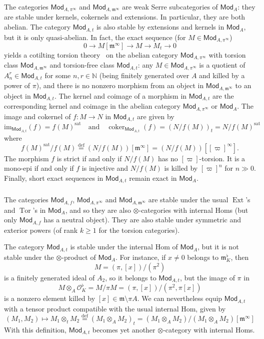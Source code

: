 \documentclass[11pt]{article}
\theoremstyle{definition}
\numberwithin{equation}{section}
\numberwithin{figure}{section}
\numberwithin{table}{section}
\newcommand{\Mod}{\mathsf{Mod}}
\DeclareMathOperator{\Ext}{Ext}
\DeclareMathOperator{\coker}{coker}
\DeclareMathOperator{\Tor}{Tor}
\newcommand{\eqd}{\stackrel{\mathrm{def}}{=}}
\begin{document}
The categories $\Mod_{A,\pi^{\infty}}$ and $\Mod_{A,\mathfrak{m}^{\infty}}$ are weak Serre subcategories of $\Mod_{A}$: they are stable under kernels, cokernels and extensions. In particular, they are both abelian. The category $\Mod_{A,t}$ is also stable by extensions and kernels in $\Mod_{A}$, but it is only quasi-abelian. In fact, the exact sequence (for $M\in\Mod_{A,\pi^{\infty}}$)
\[
0\rightarrow M[\mathfrak{m}^{\infty}]\rightarrow M\rightarrow M_{t}\rightarrow0
\]
yields a cotilting torsion theory~\cite{BoVdB03} on the abelian category $\Mod_{A,\pi^{\infty}}$ with torsion class $\Mod_{A,\mathfrak{m}^{\infty}}$ and torsion-free class $\Mod_{A,t}$: any $M\in\Mod_{A,\pi^{\infty}}$ is a quotient of $A_{n}^{r}\in\Mod_{A,t}$ for some $n,r\in\mathbb{N}$ (being finitely generated over $A$ and killed by a power of $\pi$), and there is no nonzero morphism from an object in $\Mod_{A,\mathfrak{m}^{\infty}}$ to an object in $\Mod_{A,t}$. The kernel and coimage of a morphism in $\Mod_{A,t}$ are the corresponding kernel and coimage in the abelian category $\Mod_{A,\pi^{\infty}}$ or $\Mod_{A}$. The image and cokernel of $f:M\rightarrow N$ in $\Mod_{A,t}$ are given by
\[
\mathrm{im}_{\Mod_{A,t}}(f)=f(M)^{\mathrm{sat}}\quad\text{and}\quad\coker_{\Mod_{A,t}}(f)=(N/f(M))_{t}=N/f(M)^{\mathrm{sat}}
\]
where
\[
f(M)^{\mathrm{sat}}/f(M)\eqd(N/f(M))[\mathfrak{m}^{\infty}]=(N/f(M))[[\varpi]^{\infty}].
\]
The morphism $f$ is strict if and only if $N/f(M)$ has no $[\varpi]$-torsion. It is a mono-epi if and only if $f$ is injective and $N/f(M)$ is killed by $[\varpi]^{n}$ for $n\gg0$. Finally, short exact sequences in $\Mod_{A,t}$ remain exact in $\Mod_{A}$.

\subsubsection{}

The categories $\Mod_{A,f}$, $\Mod_{A,\pi^{\infty}}$ and $\Mod_{A,\mathfrak{m}^{\infty}}$ are stable under the usual $\Ext$'s and $\Tor$'s in $\Mod_{A}$, and so they are also $\otimes$-categories with internal Homs (but only $\Mod_{A,f}$ has a neutral object). They are also stable under symmetric and exterior powers (of rank $k\geq1$ for the torsion categories).

The category $\Mod_{A,t}$ is stable under the internal Hom of $\Mod_{A}$, but it is not stable under the $\otimes$-product of $\Mod_{A}$. For instance, if $x\neq0$ belongs to $\mathfrak{m}_{K}^{\flat}$, then
\[
M=(\pi,[x])/(\pi^{2})
\]
is a finitely generated ideal of $A_{2}$, so it belongs to $\Mod_{A,t}$, but the image of $\pi$ in
\[
M\otimes_{A}\mathcal{O}_{K}^{\flat}=M/\pi M=(\pi,[x])/(\pi^{2},\pi[x])
\]
is a nonzero element killed by $[x]\in\mathfrak{m}\setminus\pi A$. We can nevertheless equip $\Mod_{A,t}$ with a tensor product compatible with the usual internal Hom, given by
\[
(M_{1},M_{2})\mapsto M_{1}\otimes_{t}M_{2}\eqd\left(M_{1}\otimes_{A}M_{2}\right)_{t}=\left(M_{1}\otimes_{A}M_{2}\right)/\left(M_{1}\otimes_{A}M_{2}\right)[\mathfrak{m}^{\infty}]
\]
With this definition, $\Mod_{A,t}$ becomes yet another $\otimes$-category with internal Homs.
\end{document}
